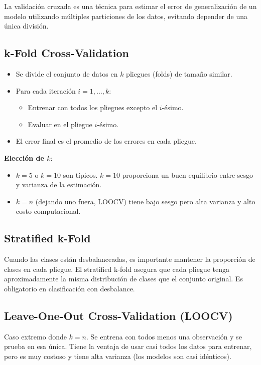 \documentclass[12pt,a4paper,openany,oneside]{book}
\begin{document}
La validación cruzada es una técnica para estimar el error de generalización de un modelo utilizando múltiples particiones de los datos, evitando depender de una única división.

\subsection{k-Fold Cross-Validation}
\begin{itemize}
    \item Se divide el conjunto de datos en \(k\) pliegues (folds) de tamaño similar.
    \item Para cada iteración \(i = 1,\dots, k\):
        \begin{itemize}
            \item Entrenar con todos los pliegues excepto el \(i\)-ésimo.
            \item Evaluar en el pliegue \(i\)-ésimo.
        \end{itemize}
    \item El error final es el promedio de los errores en cada pliegue.
\end{itemize}

\textbf{Elección de \(k\)}:
\begin{itemize}
    \item \(k = 5\) o \(k = 10\) son típicos. \(k=10\) proporciona un buen equilibrio entre sesgo y varianza de la estimación.
    \item \(k = n\) (dejando uno fuera, LOOCV) tiene bajo sesgo pero alta varianza y alto costo computacional.
\end{itemize}

\subsection{Stratified k-Fold}
Cuando las clases están desbalanceadas, es importante mantener la proporción de clases en cada pliegue. El stratified k-fold asegura que cada pliegue tenga aproximadamente la misma distribución de clases que el conjunto original. Es obligatorio en clasificación con desbalance.

\subsection{Leave-One-Out Cross-Validation (LOOCV)}
Caso extremo donde \(k = n\). Se entrena con todos menos una observación y se prueba en esa única. Tiene la ventaja de usar casi todos los datos para entrenar, pero es muy costoso y tiene alta varianza (los modelos son casi idénticos).
\end{document}
